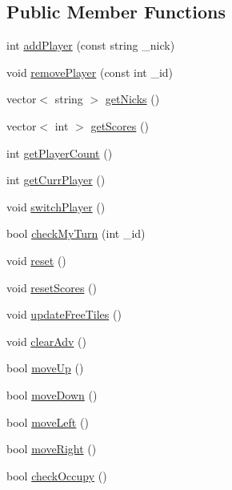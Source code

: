 \subsection*{Public Member Functions}
\begin{DoxyCompactItemize}
\item 
int \hyperlink{classServerModel_a8002df80f7319f9cc726ecf6f1cb295e}{add\-Player} (const string \-\_\-nick)
\item 
void \hyperlink{classServerModel_a03636f686c14d807e5f8e7527b4f3eca}{remove\-Player} (const int \-\_\-id)
\item 
vector$<$ string $>$ \hyperlink{classServerModel_abd04bc42130f10b6fcf9f6ff96441fe7}{get\-Nicks} ()
\item 
vector$<$ int $>$ \hyperlink{classServerModel_a42da33b42e600dfe892509a3e1f04fb0}{get\-Scores} ()
\item 
int \hyperlink{classServerModel_a53887668e0e8193fb345710d76dd12b7}{get\-Player\-Count} ()
\item 
int \hyperlink{classServerModel_a02e91f06a02510759b370eefbcb52061}{get\-Curr\-Player} ()
\item 
void \hyperlink{classServerModel_af98c5669849c1d648b6103fda3f4a10c}{switch\-Player} ()
\item 
bool \hyperlink{classServerModel_ab4cf786672a46e6285eb72907005ae64}{check\-My\-Turn} (int \-\_\-id)
\item 
void \hyperlink{classServerModel_a5ccabb0400aff1109578dacfc1162af4}{reset} ()
\item 
void \hyperlink{classServerModel_a7b17b497feec14ba4ea7746f17b479e9}{reset\-Scores} ()
\item 
void \hyperlink{classServerModel_a277375b608707d6f6c308f4a8af2e1b7}{update\-Free\-Tiles} ()
\item 
void \hyperlink{classServerModel_ad3b7678f205acbf9a6efe65ba60cfd73}{clear\-Adv} ()
\item 
bool \hyperlink{classServerModel_a71bd99e883342592c9f9842c63503044}{move\-Up} ()
\item 
bool \hyperlink{classServerModel_ac12b01ceb25260cee42e4b2f6c5afa00}{move\-Down} ()
\item 
bool \hyperlink{classServerModel_a3d33c6ca6db221fb38b12ddcd1b973d7}{move\-Left} ()
\item 
bool \hyperlink{classServerModel_a12a3fcd85eda6068b85401f398ba567f}{move\-Right} ()
\item 
bool \hyperlink{classServerModel_addd72dd4e20c62633121da9e75907cf0}{check\-Occupy} ()
\item 

\end{DoxyCompactItemize}
